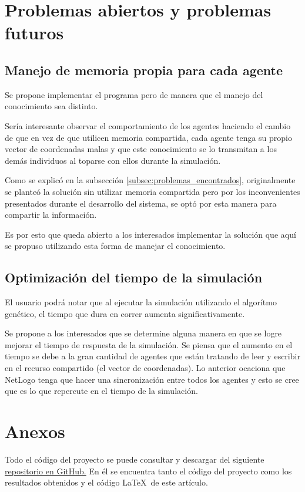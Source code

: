 \documentclass[times,10pt,twocolumn]{article}
\begin{document}
\section{Problemas abiertos y problemas futuros}

\subsection{Manejo de memoria propia para cada agente}
Se propone implementar el programa pero de manera que el manejo del conocimiento sea distinto.\par
Sería interesante observar el comportamiento de los agentes haciendo el cambio de que en vez de que utilicen memoria compartida, cada agente tenga su propio vector de coordenadas malas y que este conocimiento se lo transmitan a los demás individuos al toparse con ellos durante la simulación.\par
Como se explicó en la subsección \ref{subsec:problemas_encontrados}, originalmente se planteó la solución sin utilizar memoria compartida pero por los inconvenientes presentados durante el desarrollo del sistema, se optó por esta manera para compartir la información.\par
Es por esto que queda abierto a los interesados implementar la solución que aquí se propuso utilizando esta forma de manejar el conocimiento.

\subsection{Optimización del tiempo de la simulación}
El usuario podrá notar que al ejecutar la simulación utilizando el algorítmo genético, el tiempo que dura en correr aumenta significativamente.\par
Se propone a los interesados que se determine alguna manera en que se logre mejorar el tiempo de respuesta de la simulación. Se piensa que el aumento en el tiempo se debe a la gran cantidad de agentes que están tratando de leer y escribir en el recurso compartido (el vector de coordenadas). Lo anterior ocaciona que NetLogo tenga que hacer una sincronización entre todos los agentes y esto se cree que es lo que repercute en el tiempo de la simulación.

\section{Anexos}
Todo el código del proyecto se puede consultar y descargar del siguiente \href{https://github.com/fabo49/SupervivenciaDeEspecies}{repositorio en GitHub.} En él se encuentra tanto el código del proyecto como los resultados obtenidos y el código \LaTeX ~de este artículo.


\end{document}
